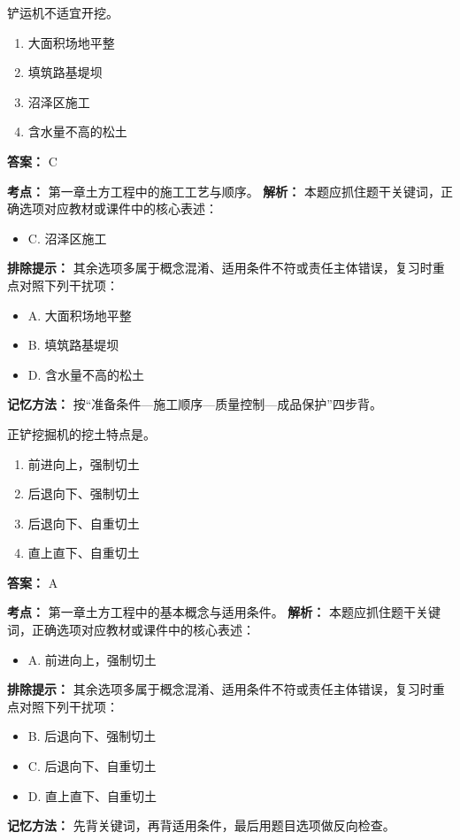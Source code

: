 \documentclass[UTF8,fontset=fandol,11pt]{ctexart}
\begin{document}
\begin{quizbox}[title={第 5 题}]
铲运机不适宜开挖。\\
\begin{enumerate}[label=\Alph*.]
\item 大面积场地平整
\item 填筑路基堤坝
\item 沼泽区施工
\item 含水量不高的松土
\end{enumerate}
\textbf{答案：} C
\vspace{0.25em}
\begin{answerbox}[title={考点解析}]
\textbf{考点：} 第一章土方工程中的施工工艺与顺序。
\textbf{解析：} 本题应抓住题干关键词，正确选项对应教材或课件中的核心表述：
\begin{itemize}
\item C. 沼泽区施工
\end{itemize}
\textbf{排除提示：} 其余选项多属于概念混淆、适用条件不符或责任主体错误，复习时重点对照下列干扰项：
\begin{itemize}
\item A. 大面积场地平整
\item B. 填筑路基堤坝
\item D. 含水量不高的松土
\end{itemize}
\textbf{记忆方法：} 按“准备条件—施工顺序—质量控制—成品保护”四步背。
\end{answerbox}
\end{quizbox}

\vspace{0.2em}

\begin{quizbox}[title={第 6 题}]
正铲挖掘机的挖土特点是。\\
\begin{enumerate}[label=\Alph*.]
\item 前进向上，强制切土
\item 后退向下、强制切土
\item 后退向下、自重切土
\item 直上直下、自重切土
\end{enumerate}
\textbf{答案：} A
\vspace{0.25em}
\begin{answerbox}[title={考点解析}]
\textbf{考点：} 第一章土方工程中的基本概念与适用条件。
\textbf{解析：} 本题应抓住题干关键词，正确选项对应教材或课件中的核心表述：
\begin{itemize}
\item A. 前进向上，强制切土
\end{itemize}
\textbf{排除提示：} 其余选项多属于概念混淆、适用条件不符或责任主体错误，复习时重点对照下列干扰项：
\begin{itemize}
\item B. 后退向下、强制切土
\item C. 后退向下、自重切土
\item D. 直上直下、自重切土
\end{itemize}
\textbf{记忆方法：} 先背关键词，再背适用条件，最后用题目选项做反向检查。
\end{answerbox}
\end{quizbox}
\end{document}
